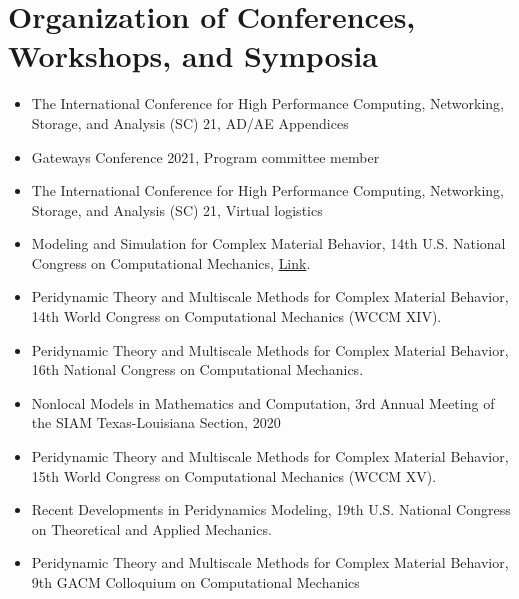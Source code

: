 \documentclass[11pt,a4paper,sans]{moderncv}
\begin{document}
\section{Organization of Conferences, Workshops, and Symposia}
\begin{itemize}[leftmargin=4cm]
\item The International Conference for High Performance Computing, Networking, Storage, and Analysis (SC) 21, AD/AE Appendices
\item Gateways Conference 2021, Program committee member
\item The International Conference for High Performance Computing, Networking, Storage, and Analysis (SC) 21, Virtual logistics
\end{itemize}

\begin{itemize}[leftmargin=4cm]
\item Modeling and Simulation for Complex Material Behavior, 14th U.S. National Congress on Computational Mechanics, \href{http://14.usnccm.org/MS402}{Link}.
\item Peridynamic Theory and Multiscale Methods for Complex Material Behavior, 14th World Congress on Computational Mechanics (WCCM XIV).
\item Peridynamic Theory and Multiscale Methods for Complex Material Behavior, 16th National Congress on Computational Mechanics. 
\item Nonlocal Models in Mathematics and Computation, 3rd Annual Meeting of the SIAM Texas-Louisiana Section, 2020 
\item Peridynamic Theory and Multiscale Methods for Complex Material Behavior, 15th World Congress on Computational Mechanics (WCCM XV).
\item Recent Developments in Peridynamics Modeling, 19th U.S. National Congress on Theoretical and Applied Mechanics.
\item  Peridynamic Theory and Multiscale Methods for Complex Material Behavior,  9th GACM Colloquium on Computational Mechanics
\end{itemize}
\end{document}
